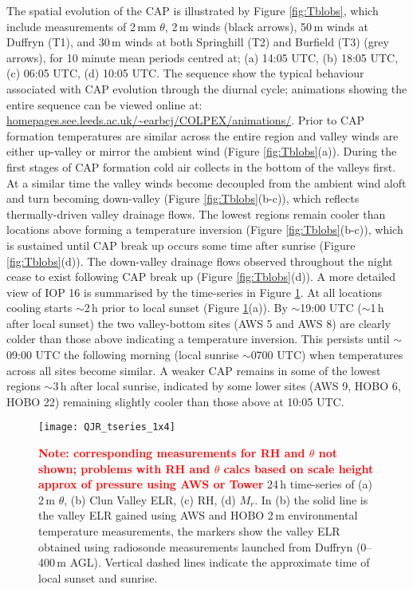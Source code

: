 \documentclass[times]{qjrms4}
\begin{document}
The spatial evolution of the CAP is illustrated by Figure \ref{fig:Tblobs}, which include measurements of 2$\,\mbox{m}$m $\theta$, 2$\,\mbox{m}$ winds (black arrows), 50$\,\mbox{m}$ winds at Duffryn (T1), and 30$\,\mbox{m}$ winds at both Springhill (T2) and Burfield (T3) (grey arrows), for 10 minute mean periods centred at; (a) 14:05 UTC, (b) 18:05 UTC, (c) 06:05 UTC, (d) 10:05 UTC. The sequence show the typical behaviour associated with CAP evolution through the diurnal cycle; animations showing the entire sequence can be viewed online at: \url{homepages.see.leeds.ac.uk/~earbcj/COLPEX/animations/}. Prior to CAP formation temperatures are similar across the entire region and valley winds are either up-valley or mirror the ambient wind (Figure \ref{fig:Tblobs}(a)). During the first stages of CAP formation cold air collects in the bottom of the valleys first. At a similar time the valley winds become decoupled from the ambient wind aloft and turn becoming down-valley (Figure \ref{fig:Tblobs}(b-c)), which reflects thermally-driven valley drainage flows. The lowest regions remain cooler than locations above forming a temperature inversion (Figure \ref{fig:Tblobs}(b-c)), which is sustained until CAP break up occurs some time after sunrise (Figure \ref{fig:Tblobs}(d)). The down-valley drainage flows observed throughout the night cease to exist following CAP break up (Figure \ref{fig:Tblobs}(d)). A more detailed view of IOP 16 is summarised by the time-series in Figure \ref{fig:tseries}. At all locations cooling starts $\sim$2$\,\mbox{h}$ prior to local sunset (Figure \ref{fig:tseries}(a)). By $\sim$19:00 UTC ($\sim$1$\,\mbox{h}$ after local sunset) the two valley-bottom sites (AWS 5 and AWS 8) are clearly colder than those above indicating a temperature inversion. This persists until $\sim$09:00 UTC the following morning (local sunrise $\sim$0700 UTC) when temperatures across all sites become similar. A weaker CAP remains in some of the lowest regions $\sim$3$\,\mbox{h}$ after local sunrise, indicated by some lower sites (AWS 9, HOBO 6, HOBO 22) remaining slightly cooler than those above at 10:05 UTC.
        \begin{figure}
        \centering
        \texttt{[image: QJR\_tseries\_1x4]}
        \caption{\textcolor{red}{\bf Note: corresponding measurements for RH and $\theta$ not shown; problems with RH and $\theta$ calcs based on scale height approx of pressure using AWS or Tower} 24$\,\mbox{h}$ time-series of (a) 2$\,\mbox{m}$ $\theta$, (b) Clun Valley ELR, (c) RH, (d) $M_r$. In (b) the solid line is the valley ELR gained using AWS and HOBO 2$\,\mbox{m}$ environmental temperature measurements, the markers show the valley ELR obtained using radiosonde measurements launched from Duffryn (0--400$\,\mbox{m}$ AGL). Vertical dashed lines indicate the approximate time of local sunset and sunrise.}
        \label{fig:tseries}
        \end{figure}
\end{document}
